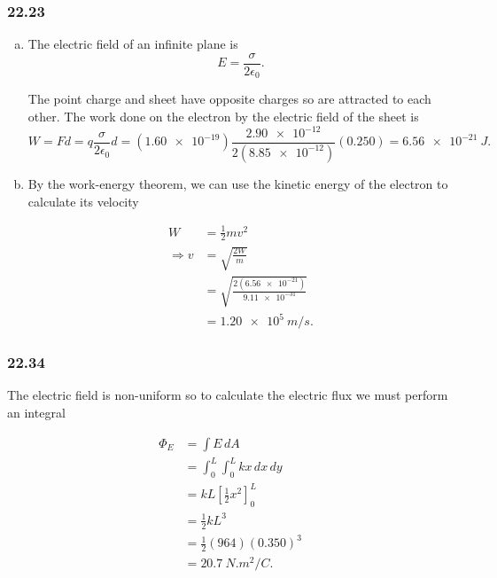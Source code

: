 \documentclass{article}
\begin{document}
\subsubsection{22.23}

\begin{enumerate}[a)]
  \item The electric field of an infinite plane is \[E = \frac{\sigma}{2 \epsilon_0}.\]

        The point charge and sheet have opposite charges so are attracted to each other. The work done on the electron by the electric field of the sheet is \[W = F d = q \frac{\sigma}{2 \epsilon_0} d = (\num{1.60e-19}) \frac{\num{2.90e-12}}{2 (\num{8.85e-12})} (0.250) = \qty{6.56e-21}{J}.\]

  \item By the work-energy theorem, we can use the kinetic energy of the electron to calculate its velocity

        \begin{align*}
          W             & = \frac{1}{2} m v^2                                \\
          \Rightarrow v & = \sqrt{\frac{2 W}{m}}                             \\
                        & = \sqrt{\frac{2 (\num{6.56e-21})}{\num{9.11e-31}}} \\
                        & = \qty{1.20e5}{m/s}.
        \end{align*}
\end{enumerate}

\subsubsection{22.34}

The electric field is non-uniform so to calculate the electric flux we must perform an integral

\begin{align*}
  \Phi_E & = \int E \, dA                           \\
         & = \int_0^L \int_0^L kx \, dx \, dy       \\
         & = k L \left[ \frac{1}{2} x^2 \right]_0^L \\
         & = \frac{1}{2} k L^3                      \\
         & = \frac{1}{2} (964) (0.350)^3            \\
         & = \qty{20.7}{N.m^2/C}.
\end{align*}
\end{document}
